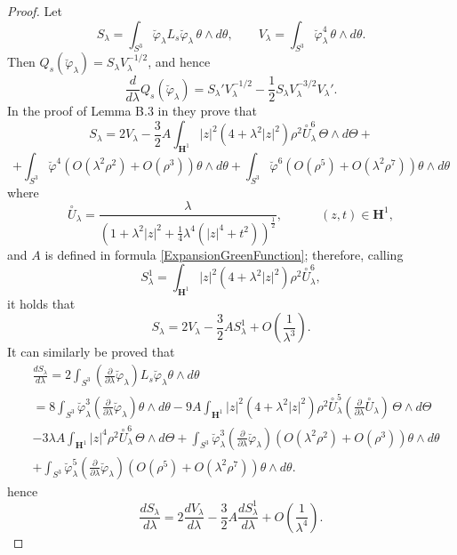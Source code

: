 \documentclass[a4paper,12pt]{amsart}
\renewcommand{\phi}{\varphi}
\newcommand{\de}{\partial}
\renewcommand{\H}{\mathbf{H}}
\renewcommand{\l}{\lambda }
\renewcommand{\th }{\theta }
\begin{document}
\begin{proof}
  Let
\[
    S_\lambda=\int_{S^3}\breve\phi_\lambda L_s\breve\phi_\lambda\,
\theta\wedge d\theta,
\qquad
V_\lambda=\int_{S^3}\breve\phi_\lambda^4\,\theta\wedge d\theta .
\]
Then \(Q_s(\breve\phi_\lambda)=S_\lambda V_\lambda^{-1/2}\), and hence
\begin{equation}\label{FormulaDerivative}
    \frac{d}{d\lambda}Q_s(\breve\phi_\lambda)
=
S_\lambda' V_\lambda^{-1/2}
-\frac12 S_\lambda V_\lambda^{-3/2}V_\lambda' .
\end{equation}
In the proof of Lemma B.3 in \cite{CMY2} they prove that
$$S_{\lambda} = 2V_{\lambda} -\frac{3}{2}A\int_{\H^1} |z|^2 (4 + \lambda^2 |z|^2) \rho^2 \overset{\circ}{U}_\lambda^6\, \Theta\wedge d\Theta + $$
$$+\int_{S^3} \breve{\phi}^4 (O (\l^2 \rho^2) + O(\rho^3)) \th \wedge d \th + \int_{S^3} \breve{\phi}^6 (O(\rho^5) + O(\l^2 \rho^7))  \th \wedge d \th$$
where
\[
  \overset{\circ}{U}_\l = \frac{\l}{\left( 1 + \l^2 |z|^2 + \frac 14 \l^4 (|z|^4 + t^2) \right)^{\frac 12}}, 
  \qquad \quad (z,t) \in \H^1,
\]
and $A$ is defined in formula \eqref{ExpansionGreenFunction};
therefore, calling
$$S^1_{\lambda}= \int_{\H^1} |z|^2 (4 + \lambda^2 |z|^2) \rho^2 \overset{\circ}{U}_\lambda^6,$$
it holds that
$$S_{\lambda} = 2V_{\lambda} -\frac{3}{2}AS^1_{\lambda} +O\left(\frac{1}{\l^3}\right).$$
It can similarly be proved that
 \begin{align}
& \frac{dS_{\lambda}}{d\lambda} 
=2\int_{S^3}\left(\frac{\de}{\de\lambda}\breve{\phi}_{\lambda} \right)L_s \breve{\phi}_\lambda \theta \wedge d \theta \nonumber\\
&=8 \int_{S^3} \breve{\phi}_\lambda^3\left(\frac{\de}{\de\lambda}\breve{\phi}_{\lambda} \right) \theta \wedge d \theta  - 9A \int_{\H^1} |z|^2 (4 + \lambda^2 |z|^2) \rho^2 \overset{\circ}{U}_\lambda^5\left(\frac{\de}{\de\lambda}\overset{\circ}{U}_{\lambda} \right) \, \Theta\wedge d\Theta \nonumber\\
&- 3\lambda A \int_{\H^1} |z|^4 \rho^2 \overset{\circ}{U}_\lambda^6 \, \Theta\wedge d\Theta + \int_{S^3} \breve{\phi}_{\lambda}^3\left(\frac{\de}{\de\lambda}\breve{\phi}_{\lambda} \right) (O (\lambda^2 \rho^2) + O(\rho^3)) \theta \wedge d \theta \nonumber\\
&+\int_{S^3} \breve{\phi}_{\lambda}^5\left(\frac{\de}{\de\lambda}\breve{\phi}_{\lambda} \right) (O(\rho^5) + O(\lambda^2 \rho^7))
  \theta \wedge d \theta . \nonumber
  \end{align}
hence
$$\frac{dS_{\lambda}}{d\lambda} = 2\frac{dV_{\lambda}}{d\lambda} - \frac{3}{2}A\frac{dS^1_{\lambda}}{d\lambda} + O\left(\frac{1}{\l^4}\right).$$

\end{proof}
\end{document}

